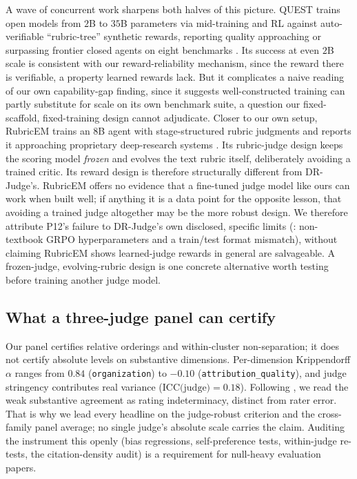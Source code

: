 \documentclass[11pt]{article}
\newcommand{\dimrow}[1]{\texttt{#1}}
\begin{document}
A wave of concurrent work sharpens both halves of this picture. QUEST trains open
models from $2$B to $35$B parameters via mid-training and RL against auto-verifiable
``rubric-tree'' synthetic rewards, reporting quality approaching or surpassing frontier
closed agents on eight benchmarks \citep{xie2026quest}. Its success at even $2$B scale is
consistent with our reward-reliability mechanism, since the reward there is verifiable,
a property learned rewards lack. But it complicates a naive reading of our own capability-gap
finding, since it suggests well-constructed training can partly substitute for scale on
its own benchmark suite, a question our fixed-scaffold, fixed-training design cannot
adjudicate.
Closer to our own setup, RubricEM trains an $8$B agent with stage-structured rubric
judgments and reports it approaching proprietary deep-research systems
\citep{li2026rubricem}. Its rubric-judge design keeps the scoring model
\emph{frozen} and evolves the text rubric itself, deliberately avoiding a trained
critic. Its reward design is therefore structurally different from DR-Judge's. RubricEM
offers no evidence that a fine-tuned judge model like ours can work when built well; if anything
it is a data point for the opposite lesson, that avoiding a trained judge altogether may be
the more robust design. We therefore attribute P12's failure to DR-Judge's own disclosed,
specific limits (: non-textbook GRPO hyperparameters and a train/test
format mismatch), without claiming RubricEM shows learned-judge rewards in general are
salvageable. A frozen-judge, evolving-rubric design is one concrete alternative worth
testing before training another judge model.

\subsection{What a three-judge panel can certify}\label{sec:panel}
Our panel certifies relative orderings and within-cluster non-separation; it does not
certify absolute levels on substantive dimensions. Per-dimension Krippendorff $\alpha$
ranges from $0.84$ (\dimrow{organization}) to $-0.10$ (\dimrow{attribution\_quality}),
and judge stringency contributes real variance ($\text{ICC(judge)}=0.18$). Following
\citet{guerdan2025rating_indeterminacy}, we read the weak substantive agreement as
rating indeterminacy, distinct from rater error. That is why we lead every headline on
the judge-robust criterion and the cross-family panel average; no single judge's absolute
scale carries the claim. Auditing the instrument this openly (bias regressions,
self-preference tests, within-judge re-tests, the citation-density audit) is a
requirement for null-heavy evaluation papers.
\end{document}
